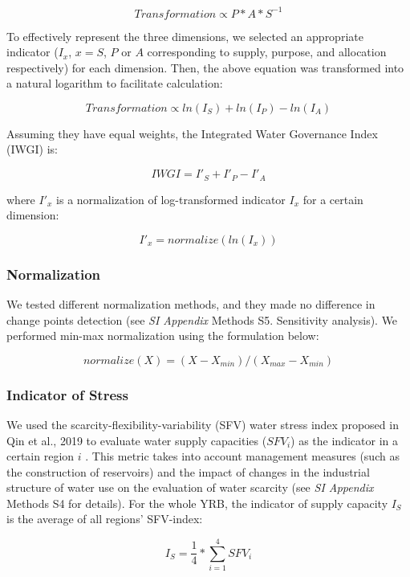 \documentclass[9pt, twocolumn, twoside, lineno]{pnas-new}
\begin{document}
{	$$ Transformation \propto P*A*S^{-1}$$

	To effectively represent the three dimensions, we selected an appropriate indicator ($I_x$, $x=S$, $P$ or $A$ corresponding to supply, purpose, and allocation respectively) for each dimension. Then, the above equation was transformed into a natural logarithm to facilitate calculation:

	$$ Transformation \propto ln(I_S) + ln(I_P) - ln(I_A) $$

	Assuming they have equal weights, the Integrated Water Governance Index (IWGI) is:

	$$ IWGI = I'_S + I'_P - I'_A $$

	where $I'_x$ is a normalization of log-transformed indicator $I_x$ for a certain dimension:

	$$ I'_x = normalize(ln(I_x)) $$
	
	\subsubsection*{Normalization}
	We tested different normalization methods, and they made no difference in change points detection (see \textit{SI Appendix} Methods S5. Sensitivity analysis). We performed min-max normalization using the formulation below:

	$$ normalize(X) = (X - X_{min}) / (X_{max} - X_{min}) $$

	\subsubsection*{Indicator of Stress}
	We used the scarcity-flexibility-variability (SFV) water stress index proposed in Qin et al., 2019 to evaluate water supply capacities ($SFV_i$) as the indicator in a certain region $i$ \cite{qin2019}. This metric takes into account management measures (such as the construction of reservoirs) and the impact of changes in the industrial structure of water use on the evaluation of water scarcity (see \textit{SI Appendix} Methods S4 for details). For the whole YRB, the indicator of supply capacity $I_S$ is the average of all regions' SFV-index: 

	$$ I_S = \frac{1}{4} * \sum_{i=1}^4 SFV_{i} $$
	
}
\end{document}
